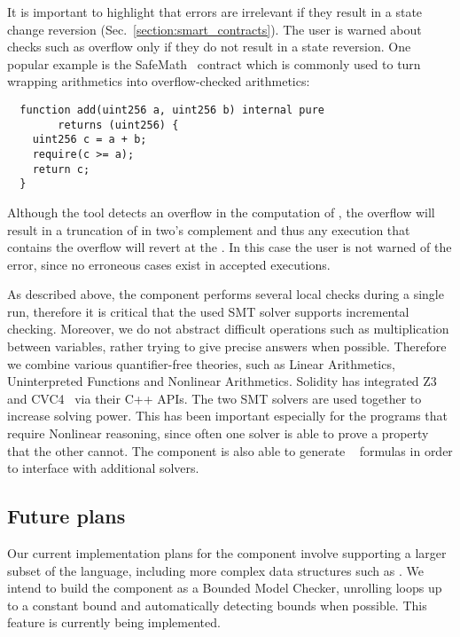 It is important to highlight that errors are irrelevant if they result in a
state change reversion (Sec.~\ref{section:smart_contracts}). The user is warned
about checks such as overflow only if they do not result in a state reversion.
%
One popular example is the SafeMath~\cite{SafeMath} contract which
is commonly used to turn wrapping arithmetics into overflow-checked arithmetics:

\begin{verbatim}
  function add(uint256 a, uint256 b) internal pure
        returns (uint256) {
    uint256 c = a + b;
    require(c >= a);
    return c;
  }
\end{verbatim}

Although the tool detects an overflow in the computation of ,
the overflow will result in a truncation of  in two's complement and thus
any execution that contains the overflow will revert at the .
%
In this case the user is not warned of the error, since no erroneous cases
exist in accepted executions.


As described above, the component performs several local checks during a single
run, therefore it is critical that the used SMT solver supports
incremental checking.
%
Moreover, we do not abstract difficult operations such as multiplication
between variables, rather trying to give precise answers when possible.
%
Therefore we combine various quantifier-free theories, such as Linear
Arithmetics, Uninterpreted Functions and Nonlinear Arithmetics. 
%
Solidity has integrated Z3~\cite{Z3} and CVC4~\cite{CVC4} via their C++ APIs.
%
The two SMT solvers are used together to increase solving power.
%
This has been important especially for the programs that require Nonlinear
reasoning, since often one solver is able to prove a property that the other
cannot.
%
The component is also able to generate ~\cite{SMTLIB}
formulas in order to interface with additional solvers.


\subsection{Future plans}

Our current implementation plans for the component involve supporting
a larger subset of the language, including more complex data structures
such as .
%
We intend to build the component as a Bounded Model Checker, unrolling loops
up to a constant bound and automatically detecting bounds when possible.
%
This feature is currently being implemented.

